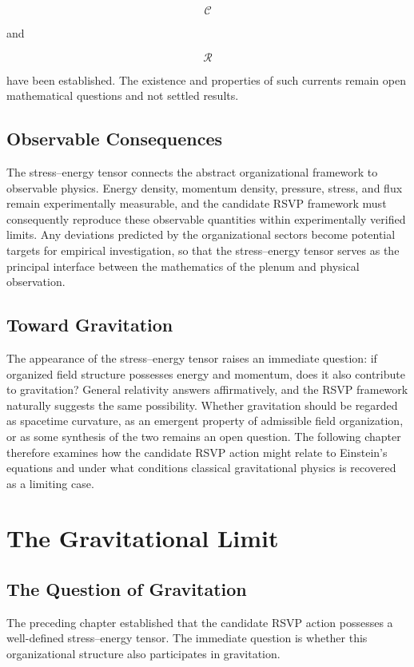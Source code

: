 \documentclass[11pt,oneside]{book}
\numberwithin{equation}{chapter}
\theoremstyle{definition}
\theoremstyle{plain}
\begin{document}
\[
\mathcal C
\]

and

\[
\mathcal R
\]

have been established. The existence and properties of such currents remain open mathematical questions and not settled results.

\section{Observable Consequences}

The stress--energy tensor connects the abstract organizational framework to observable physics. Energy density, momentum density, pressure, stress, and flux remain experimentally measurable, and the candidate RSVP framework must consequently reproduce these observable quantities within experimentally verified limits. Any deviations predicted by the organizational sectors become potential targets for empirical investigation, so that the stress--energy tensor serves as the principal interface between the mathematics of the plenum and physical observation.

\section{Toward Gravitation}

The appearance of the stress--energy tensor raises an immediate question: if organized field structure possesses energy and momentum, does it also contribute to gravitation? General relativity answers affirmatively, and the RSVP framework naturally suggests the same possibility. Whether gravitation should be regarded as spacetime curvature, as an emergent property of admissible field organization, or as some synthesis of the two remains an open question. The following chapter therefore examines how the candidate RSVP action might relate to Einstein's equations and under what conditions classical gravitational physics is recovered as a limiting case.

\chapter{The Gravitational Limit}

\section{The Question of Gravitation}

The preceding chapter established that the candidate RSVP action possesses a
well-defined stress--energy tensor. The immediate question is whether this
organizational structure also participates in gravitation.
\end{document}
